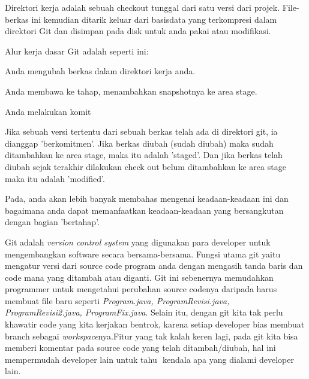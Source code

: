 \noindent 
Direktori kerja adalah sebuah checkout tunggal dari satu versi dari projek. File-berkas ini kemudian ditarik keluar dari basisdata yang terkompresi dalam direktori Git dan disimpan pada disk untuk anda pakai atau modifikasi. \par
\noindent 
 \hspace*{0.5in} Alur kerja dasar Git adalah seperti ini: \par
\noindent 
 \hspace*{0.5in} Anda mengubah berkas dalam direktori kerja anda. \par
\noindent 
 \hspace*{0.5in} Anda membawa ke tahap, menambahkan snapshotnya ke area stage. \par
\noindent 
 \hspace*{0.5in} Anda melakukan komit  \par
  \vspace{\baselineskip}
\noindent 
Jika sebuah versi tertentu dari sebuah berkas telah ada di direktori git, ia dianggap 'berkomitmen'. Jika berkas diubah (sudah diubah) maka sudah ditambahkan ke area stage, maka itu adalah 'staged'. Dan jika berkas telah diubah sejak terakhir dilakukan check out belum ditambahkan ke area stage maka itu adalah 'modified'. \par
\noindent 
Pada, anda akan lebih banyak membahas mengenai keadaan-keadaan ini dan bagaimana anda dapat memanfaatkan keadaan-keadaan yang bersangkutan dengan bagian 'bertahap'. \par
 \vspace{\baselineskip}
\noindent 
Git adalah $  $\textit{version control system} $  $yang digunakan para developer untuk mengembangkan software secara bersama-bersama. Fungsi utama git yaitu mengatur versi dari source code program anda dengan mengasih tanda baris dan code mana yang ditambah atau diganti.  Git ini sebenernya memudahkan programmer untuk mengetahui perubahan source codenya daripada harus membuat file baru seperti $  $\textit{Program.java, ProgramRevisi.java,}\textit{ }\textit{ProgramRevisi2.java, ProgramFix.java}. Selain itu, dengan git kita tak perlu khawatir code yang kita kerjakan bentrok, karena setiap developer bias membuat branch sebagai $  $\textit{workspace}nya.Fitur yang tak kalah keren lagi, pada git kita bisa memberi komentar pada source code yang telah ditambah/diubah, hal ini mempermudah developer lain untuk tahu $  $ kendala apa yang dialami developer lain. \par
 \vspace{\baselineskip}
